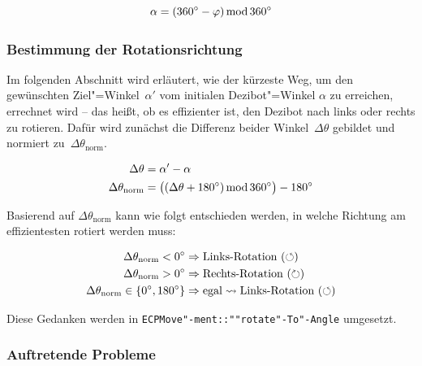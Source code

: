 {\vspace{-1em}

\begin{equation*}
    \alpha = (360^\circ - \varphi) \operatorname{mod} 360^\circ
\end{equation*}


\subsubsection{Bestimmung der Rotationsrichtung}
\label{sec:rotation-direction-determination}

Im folgenden Abschnitt wird erläutert, wie der kürzeste Weg, um den gewünschten Ziel"=Winkel~$\alpha'$ vom initialen Dezibot"=Winkel $\alpha$ zu erreichen, errechnet wird -- das heißt, ob es effizienter ist, den Dezibot nach links oder rechts zu rotieren. Dafür wird zunächst die Differenz beider Winkel~$\Delta\theta$ gebildet und normiert zu~$\Delta\theta_{\text{norm}}$.

\vspace{-1em}
\begin{equation*}
\begin{aligned}
    \Delta\theta &= \alpha' - \alpha \\
    \Delta\theta_{\text{norm}} &= \big( (\Delta\theta + 180^\circ) \operatorname{mod} 360^\circ \big) - 180^\circ
\end{aligned}
\end{equation*}

Basierend auf $\Delta\theta_{\text{norm}}$ kann wie folgt entschieden werden, in welche Richtung am effizientesten rotiert werden muss:

\vspace{-1em}
\begin{equation*}
\begin{aligned}
    \Delta\theta_{\text{norm}} < 0^\circ &\Rightarrow \text{Links-Rotation} ~(\circlearrowleft)\\
    \Delta\theta_{\text{norm}} > 0^\circ &\Rightarrow \text{Rechts-Rotation} ~(\circlearrowright)\\
    \Delta\theta_{\text{norm}} \in \lbrace 0^\circ, 180^\circ \rbrace &\Rightarrow \text{egal} \leadsto \text{Links-Rotation} ~(\circlearrowleft)
\end{aligned}
\end{equation*}

Diese Gedanken werden in \texttt{ECPMove"-ment::""rotate"-To"-Angle} umgesetzt.


\subsubsection{Auftretende Probleme}

}
